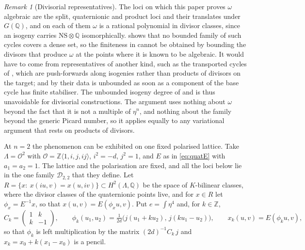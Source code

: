 \documentclass[11pt,reqno]{amsart}
\theoremstyle{plain}
\theoremstyle{definition}
\theoremstyle{remark}
\newtheorem{remark}[theorem]{Remark}
\newcommand{\QQ}{\mathbb{Q}}
\newcommand{\ZZ}{\mathbb{Z}}
\newcommand{\cO}{\mathcal{O}}
\newcommand{\cD}{\mathcal{D}}
\newcommand{\NS}{\mathrm{NS}}
\begin{document}
\begin{remark}[Divisorial representatives]\label{rem:divroute}
The loci on which this paper proves $\omega$ algebraic are the split,
quaternionic and product loci and their translates under $G(\QQ)$, and on
each of them $\omega$ is a rational polynomial in divisor classes, since an
isogeny carries $\NS\otimes\QQ$ isomorphically.  shows
that no bounded family of such cycles covers a dense set, so the finiteness
in  cannot be obtained by bounding the divisors that
produce $\omega$ at the points where it is known to be algebraic. It would
have to come from representatives of another kind, such as the transported
cycles of , which are push-forwards along isogenies
rather than products of divisors on the target; and by 
their data is unbounded as soon as a component of the base cycle has finite
stabiliser. The unbounded isogeny degree of  and
 is thus unavoidable for divisorial constructions.
The argument uses nothing about $\omega$ beyond the fact that it is not a
multiple of $\eta^{n}$, and nothing about the family beyond the generic
Picard number, so it applies equally to any variational argument that rests
on products of divisors.
\end{remark}

At $n=2$ the phenomenon can be exhibited on one fixed polarised lattice. Take
$\Lambda=\cO^{2}$ with $\cO=\ZZ\langle1,i,j,ij\rangle$, $i^{2}=-d$, $j^{2}=1$,
and $E$ as in \eqref{eq:quatE} with $a_{1}=a_{2}=1$. The lattice and the
polarisation are fixed, and all the loci below lie in the one family
$\cD_{2,2}$ that they define. Let
$R=\{x:\ x(iu,v)=x(u,iv)\}\subset H^{2}(\Lambda,\QQ)$ be the space of
$K$-bilinear classes, where the divisor classes of the quaternionic points
live, and for $x\in R$ let $\phi_{x}=E^{-1}x$, so that $x(u,v)=E(\phi_{x}u,v)$.
Put $e=\int\eta^{4}$ and, for $k\in\ZZ$,
\[
  C_{k}=\begin{pmatrix}1&k\\k&-1\end{pmatrix},\qquad
  \phi_{k}(u_{1},u_{2})=\tfrac{1}{2d}\bigl(j(u_{1}+ku_{2}),\,j(ku_{1}-u_{2})\bigr),
  \qquad x_{k}(u,v)=E(\phi_{k}u,v),
\]
so that $\phi_{k}$ is left multiplication by the matrix $(2d)^{-1}C_{k}\,j$
and $x_{k}=x_{0}+k(x_{1}-x_{0})$ is a pencil.
\end{document}

